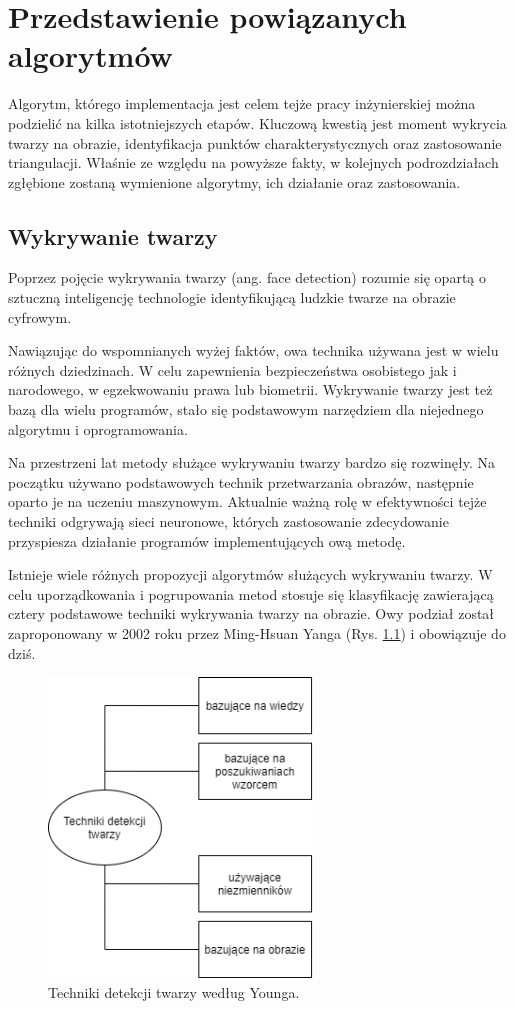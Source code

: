 \chapter{Przedstawienie powiązanych algorytmów}
\label{cha:analizaTeoretycznaProblemu}
Algorytm, którego implementacja jest celem tejże pracy inżynierskiej można podzielić na kilka istotniejszych etapów. Kluczową kwestią jest moment wykrycia twarzy na obrazie, identyfikacja punktów charakterystycznych oraz zastosowanie triangulacji. Właśnie ze względu na  powyższe fakty, w kolejnych podrozdziałach zgłębione zostaną wymienione algorytmy, ich działanie oraz zastosowania. 

\section{Wykrywanie twarzy}
Poprzez pojęcie wykrywania twarzy (ang. face detection) \cite{fDetection} rozumie się opartą o sztuczną inteligencję technologie identyfikującą ludzkie twarze na obrazie cyfrowym. 

Nawiązując do wspomnianych wyżej faktów, owa technika używana jest w wielu różnych dziedzinach. W celu zapewnienia bezpieczeństwa osobistego jak i narodowego, w egzekwowaniu prawa lub biometrii. Wykrywanie twarzy jest też bazą dla wielu programów, stało się podstawowym narzędziem dla niejednego algorytmu i oprogramowania.

Na przestrzeni lat metody służące wykrywaniu twarzy bardzo się rozwinęły. Na początku używano podstawowych technik przetwarzania obrazów, następnie oparto je na uczeniu maszynowym. Aktualnie ważną rolę w efektywności tejże techniki odgrywają sieci neuronowe, których zastosowanie zdecydowanie przyspiesza działanie programów implementujących ową metodę.

Istnieje wiele różnych propozycji algorytmów służących wykrywaniu twarzy. W celu uporządkowania i pogrupowania metod stosuje się klasyfikację zawierającą cztery podstawowe techniki wykrywania twarzy na obrazie. Owy podział został zaproponowany w 2002 roku przez Ming-Hsuan Yanga (Rys. \ref{fig:detectionMethods}) i obowiązuje do dziś.

\begin{figure}[h]
	\centering
	\includegraphics[width=7cm]{techniki-detekcji.png}
	\caption{Techniki detekcji twarzy według Younga.} 
	\label{fig:detectionMethods}
\end{figure}

